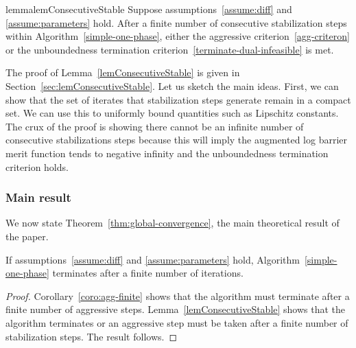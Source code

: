 \documentclass{article}
\begin{document}

\begin{restatable}{lemma}{lemConsecutiveStable}\label{lemConsecutiveStable}
Suppose assumptions~\ref{assume:diff} and \ref{assume:parameters} hold. 
After a finite number of consecutive stabilization steps within Algorithm~\ref{simple-one-phase}, either the aggressive criterion~\eqref{agg-criteron} or the unboundedness termination criterion~\eqref{terminate-dual-infeasible} is met.
\end{restatable}

The proof of Lemma~\ref{lemConsecutiveStable} is given in Section~\ref{sec:lemConsecutiveStable}. Let us sketch the main ideas. First, we can show that the set of iterates that stabilization steps generate remain in a compact set. We can use this to uniformly bound quantities such as Lipschitz constants. The crux of the proof is showing there cannot be an infinite number of consecutive stabilizations steps because this will imply the augmented log barrier merit function tends to negative infinity and the unboundedness termination criterion holds.

\subsubsection{Main result}\label{subsec:main-result}

We now state Theorem~\ref{thm:global-convergence}, the main theoretical result of the paper.

\begin{theorem}\label{thm:global-convergence}
If assumptions~\ref{assume:diff} and \ref{assume:parameters} hold, Algorithm~\ref{simple-one-phase} terminates after a finite number of iterations.
\end{theorem}

\begin{proof}
Corollary~\ref{coro:agg-finite} shows that the algorithm must terminate after a finite number of aggressive steps. Lemma~\ref{lemConsecutiveStable} shows that the algorithm terminates or an aggressive step must be taken after a finite number of stabilization steps. The result follows.
\end{proof}
\end{document}
